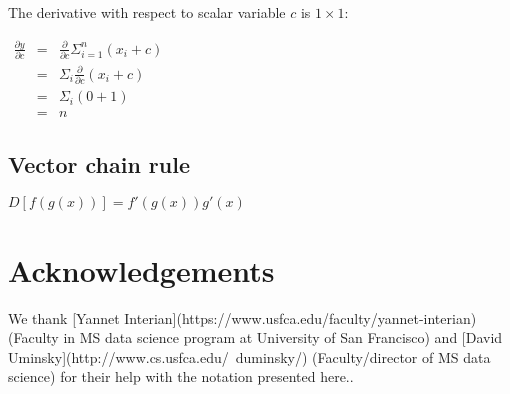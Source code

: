 \documentclass[11pt]{article}
\begin{document}
The derivative with respect to scalar variable $c$ is $1 \times 1$:

$
\begin{array}{lcl}
\frac{\partial y}{\partial c} & = & \frac{\partial}{\partial c} \Sigma_{i=1}^n (x_i+c)\\
& = & \Sigma_i \frac{\partial}{\partial c} (x_i+c)\\
& = & \Sigma_i (0 + 1)\\
& = & n
\end{array}
$

\subsection{Vector chain rule}

$D[f(g(x))] = f'(g(x))g'(x)$

\section{Acknowledgements}

We thank [Yannet Interian](https://www.usfca.edu/faculty/yannet-interian) (Faculty in MS data science program at University of San Francisco) and [David Uminsky](http://www.cs.usfca.edu/~duminsky/) (Faculty/director of MS data science) for their help with the notation presented here..
\end{document}
